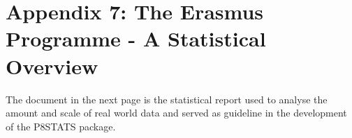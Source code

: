 \chapter{Appendix 7: The Erasmus Programme - A Statistical Overview}
The document in the next page is the statistical report used to analyse the
amount and scale of real world data and served as guideline in the development
of the P8STATS package.
